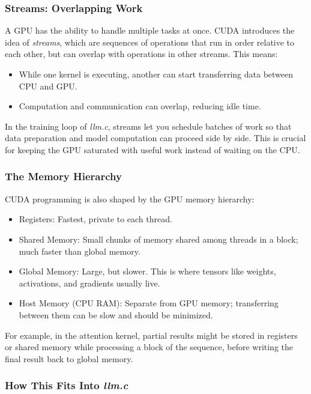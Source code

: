 \documentclass[
  letterpaper,
  DIV=11,
  numbers=noendperiod]{scrreprt}
\providecommand{\tightlist}{%
  \setlength{\itemsep}{0pt}\setlength{\parskip}{0pt}}
\begin{document}
\subsubsection{Streams: Overlapping
Work}\label{streams-overlapping-work}

A GPU has the ability to handle multiple tasks at once. CUDA introduces
the idea of \emph{streams}, which are sequences of operations that run
in order relative to each other, but can overlap with operations in
other streams. This means:

\begin{itemize}
\tightlist
\item
  While one kernel is executing, another can start transferring data
  between CPU and GPU.
\item
  Computation and communication can overlap, reducing idle time.
\end{itemize}

In the training loop of \emph{llm.c}, streams let you schedule batches
of work so that data preparation and model computation can proceed side
by side. This is crucial for keeping the GPU saturated with useful work
instead of waiting on the CPU.

\subsubsection{The Memory Hierarchy}\label{the-memory-hierarchy}

CUDA programming is also shaped by the GPU memory hierarchy:

\begin{itemize}
\tightlist
\item
  Registers: Fastest, private to each thread.
\item
  Shared Memory: Small chunks of memory shared among threads in a block;
  much faster than global memory.
\item
  Global Memory: Large, but slower. This is where tensors like weights,
  activations, and gradients usually live.
\item
  Host Memory (CPU RAM): Separate from GPU memory; transferring between
  them can be slow and should be minimized.
\end{itemize}

For example, in the attention kernel, partial results might be stored in
registers or shared memory while processing a block of the sequence,
before writing the final result back to global memory.

\subsubsection{\texorpdfstring{How This Fits Into
\emph{llm.c}}{How This Fits Into llm.c}}\label{how-this-fits-into-llm.c}
\end{document}
